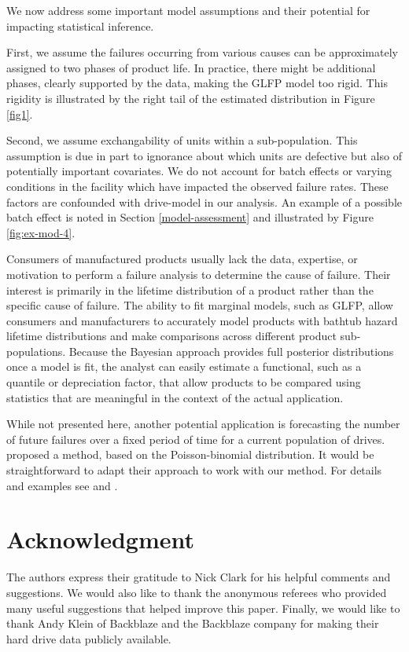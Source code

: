 \documentclass[11pt]{article}
\begin{document}
We now address some important model assumptions and their potential for impacting statistical inference. 

First, we assume the failures occurring from various causes can be approximately assigned to two phases of product life.  In practice, there might be additional phases, clearly supported by the data, making the GLFP model too rigid. This rigidity is illustrated by the right tail of the estimated distribution in Figure \ref{fig1}.

Second, we assume exchangability of units within a sub-population. This assumption is due in part to ignorance about which units are defective but also of potentially important covariates. We do not account for batch effects or varying conditions in the facility which have impacted the observed failure rates. These factors are confounded with drive-model in our analysis. An example of a possible batch effect is noted in Section \ref{model-assessment} and illustrated by Figure \ref{fig:ex-mod-4}. 

Consumers of manufactured products usually lack the data, expertise, or motivation to perform a failure analysis to determine the cause of failure.  Their interest is primarily in the lifetime distribution of a product rather than the specific cause of failure.  The ability to fit marginal models, such as GLFP, allow consumers and manufacturers to accurately model products with bathtub hazard lifetime distributions and make comparisons across different product sub-populations.  Because the Bayesian approach provides full posterior distributions once a model is fit, the analyst can easily estimate a functional, such as a quantile or depreciation factor, that allow products to be compared using statistics that are meaningful in the context of the actual application. 

While not presented here, another potential application is forecasting the number of future failures over a fixed period of time for a current population of drives. \citet{hmm} proposed a method, based on the Poisson-binomial distribution. It would be straightforward to adapt their approach to work with our method. For details and examples see \citet[Sect.~6]{hmm} and \citet{xu2015assessing}.

\section*{Acknowledgment}    
The authors express their gratitude to Nick Clark for his helpful comments and suggestions.  We would also like to thank the anonymous referees who provided 
many useful suggestions that helped improve this paper. Finally, we would like to thank Andy Klein of Backblaze and the Backblaze company for making their hard drive data publicly available.
\end{document}
